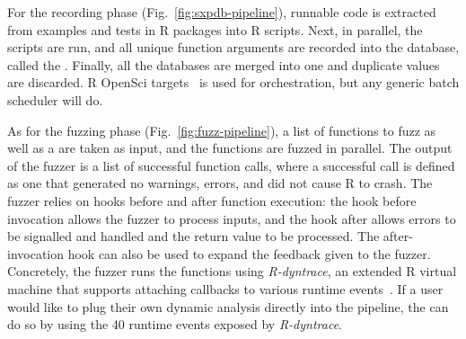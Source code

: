 \documentclass[sigplan,nonacm,anonymous,review]{acmart}
\begin{document}
For the recording phase (Fig.~\ref{fig:sxpdb-pipeline}), runnable code is extracted from examples and tests in R packages into R scripts.
Next, in parallel, the scripts are run, and all unique function arguments are recorded into the database, called the \sxpdb.
Finally, all the databases are merged into one and duplicate values are discarded.
R OpenSci targets~\cite{landau2021_targets} is used for orchestration, but any generic batch scheduler will do.

As for the fuzzing phase (Fig.~\ref{fig:fuzz-pipeline}), a list of functions to fuzz as well as a \sxpdb are taken as input, and the functions are fuzzed in parallel.
The output of the fuzzer is a list of successful function calls, where a successful call is defined as one that generated no warnings, errors, and did not cause R to crash.
The fuzzer relies on hooks before and after function execution: the hook before invocation allows the fuzzer to process inputs, and the hook after allows errors to be signalled and handled and the return value to be processed.
The after-invocation hook can also be used to expand the feedback given to the fuzzer.
Concretely, the fuzzer runs the functions using \emph{R-dyntrace}, an extended R virtual machine that supports attaching callbacks to various runtime events~\cite{goel2019}.
If a user would like to plug their own dynamic analysis directly into the pipeline, the can do so by using the 40 runtime events exposed by \emph{R-dyntrace}.
\end{document}
